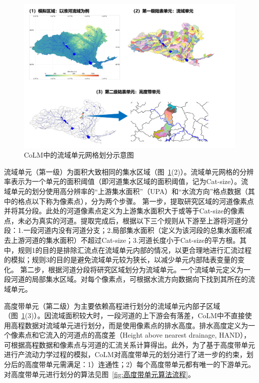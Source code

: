 {
\begin{figure}[htbp]
\centering
\includegraphics[width=\textwidth]{Figures/模式构架/流域单元示意图.jpg}
\caption{CoLM中的流域单元网格划分示意图}
\label{fig:流域单元示意图}
\end{figure}
}

流域单元（第一级）为面积大致相同的集水区域（图~\ref{fig:流域单元示意图}(2)）。流域单元网格的分辨率表示为一个单元的面积阈值（即河道集水区域的面积阈值，记为Cat-size）。流域单元的划分使用高分辨率的“上游集水面积”（UPA）和“水流方向”格点数据（其中的格点以下称为像素点），分为两个步骤。
第一步，提取研究区域的河道像素点并将其分段。此处的河道像素点定义为上游集水面积大于或等于Cat-size的像素点，未必为真实的河道。提取完成后，根据以下三个规则从下游至上游将河道分段：1.一段河道内没有河道分支；2.局部集水面积（定义为该河段的总集水面积减去上游河道的集水面积）不超过Cat-size；3.河道长度小于Cat-size的平方根。其中，规则1的目的是排除汇流点在流域单元内部的情况，以更合理地进行汇流过程的模拟；规则3的目的是避免流域单元较为狭长，以减少单元内部陆表变量的变化。
第二步，根据河道分段将研究区域划分为流域单元。一个流域单元定义为一段河道的局部集水区域。对每个像素点，可根据水流方向数据向下找到其所在的流域单元。

高度带单元（第二级）为主要依赖高程进行划分的流域单元内部子区域（图~\ref{fig:流域单元示意图}(3)）。因流域面积较大时，一段河道的上下游会有落差，CoLM中不直接使用高程数据对流域单元进行划分，而是使用像素点的排水高度。排水高度定义为一个像素点和它流入的河道点的高度差（Height above nearest drainage, HAND），可根据高程数据和像素点与河道的汇流关系计算得出。此外，为了基于高度带单元进行产流动力学过程的模拟，CoLM对高度带单元的划分进行了进一步的约束，划分后的高度带单元需满足：1）连通性；2）每个高度带单元都有唯一的下游单元。对高度带单元进行划分的算法见图~\ref{fig:高度带单元算法流程}。

